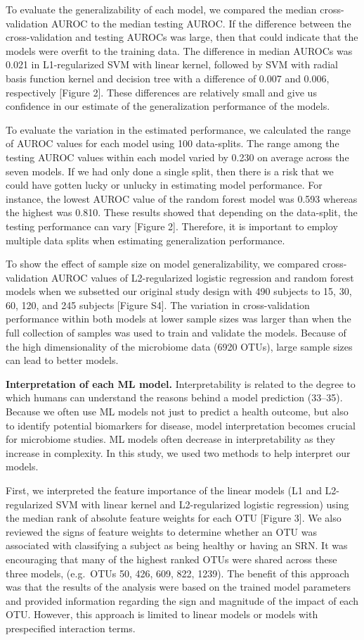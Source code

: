 \documentclass[11pt,]{article}
\begin{document}
To evaluate the generalizability of each model, we compared the median
cross-validation AUROC to the median testing AUROC. If the difference
between the cross-validation and testing AUROCs was large, then that
could indicate that the models were overfit to the training data. The
difference in median AUROCs was 0.021 in L1-regularized SVM with linear
kernel, followed by SVM with radial basis function kernel and decision
tree with a difference of 0.007 and 0.006, respectively {[}Figure 2{]}.
These differences are relatively small and give us confidence in our
estimate of the generalization performance of the models.

To evaluate the variation in the estimated performance, we calculated
the range of AUROC values for each model using 100 data-splits. The
range among the testing AUROC values within each model varied by 0.230
on average across the seven models. If we had only done a single split,
then there is a risk that we could have gotten lucky or unlucky in
estimating model performance. For instance, the lowest AUROC value of
the random forest model was 0.593 whereas the highest was 0.810. These
results showed that depending on the data-split, the testing performance
can vary {[}Figure 2{]}. Therefore, it is important to employ multiple
data splits when estimating generalization performance.

To show the effect of sample size on model generalizability, we compared
cross-validation AUROC values of L2-regularized logistic regression and
random forest models when we subsetted our original study design with
490 subjects to 15, 30, 60, 120, and 245 subjects {[}Figure S4{]}. The
variation in cross-validation performance within both models at lower
sample sizes was larger than when the full collection of samples was
used to train and validate the models. Because of the high
dimensionality of the microbiome data (6920 OTUs), large sample sizes
can lead to better models.

\textbf{Interpretation of each ML model.} Interpretability is related to
the degree to which humans can understand the reasons behind a model
prediction (33--35). Because we often use ML models not just to predict
a health outcome, but also to identify potential biomarkers for disease,
model interpretation becomes crucial for microbiome studies. ML models
often decrease in interpretability as they increase in complexity. In
this study, we used two methods to help interpret our models.

First, we interpreted the feature importance of the linear models (L1
and L2-regularized SVM with linear kernel and L2-regularized logistic
regression) using the median rank of absolute feature weights for each
OTU {[}Figure 3{]}. We also reviewed the signs of feature weights to
determine whether an OTU was associated with classifying a subject as
being healthy or having an SRN. It was encouraging that many of the
highest ranked OTUs were shared across these three models, (e.g.~OTUs
50, 426, 609, 822, 1239). The benefit of this approach was that the
results of the analysis were based on the trained model parameters and
provided information regarding the sign and magnitude of the impact of
each OTU. However, this approach is limited to linear models or models
with prespecified interaction terms.
\end{document}
